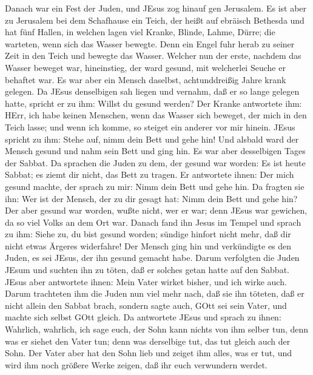  Danach war ein Fest der Juden, und JEsus zog hinauf gen
Jerusalem.  Es ist aber zu Jerusalem bei dem Schafhause ein
Teich, der heißt auf ebräisch Bethesda und hat fünf Hallen, 
in welchen lagen viel Kranke, Blinde, Lahme, Dürre; die warteten, wenn
sich das Wasser bewegte.  Denn ein Engel fuhr herab zu
seiner Zeit in den Teich und bewegte das Wasser. Welcher nun der erste,
nachdem das Wasser beweget war, hineinstieg, der ward gesund, mit
welcherlei Seuche er behaftet war.  Es war aber ein Mensch
daselbst, achtunddreißig Jahre krank gelegen.  Da JEsus
denselbigen sah liegen und vernahm, daß er so lange gelegen hatte,
spricht er zu ihm: Willst du gesund werden?  Der Kranke
antwortete ihm: HErr, ich habe keinen Menschen, wenn das Wasser sich
beweget, der mich in den Teich lasse; und wenn ich komme, so steiget ein
anderer vor mir hinein.  JEsus spricht zu ihm: Stehe auf,
nimm dein Bett und gehe hin!  Und alsbald ward der Mensch
gesund und nahm sein Bett und ging hin. Es war aber desselbigen Tages
der Sabbat.  Da sprachen die Juden zu dem, der gesund war
worden: Es ist heute Sabbat; es ziemt dir nicht, das Bett zu tragen.
 Er antwortete ihnen: Der mich gesund machte, der sprach zu
mir: Nimm dein Bett und gehe hin.  Da fragten sie ihn: Wer
ist der Mensch, der zu dir gesagt hat: Nimm dein Bett und gehe hin?
 Der aber gesund war worden, wußte nicht, wer er war; denn
JEsus war gewichen, da so viel Volks an dem Ort war. 
Danach fand ihn Jesus im Tempel und sprach zu ihm: Siehe zu, du bist
gesund worden; sündige hinfort nicht mehr, daß dir nicht etwas Ärgeres
widerfahre!  Der Mensch ging hin und verkündigte es den
Juden, es sei JEsus, der ihn gesund gemacht habe.  Darum
verfolgten die Juden JEsum und suchten ihn zu töten, daß er solches
getan hatte auf den Sabbat.  JEsus aber antwortete ihnen:
Mein Vater wirket bisher, und ich wirke auch.  Darum
trachteten ihm die Juden nun viel mehr nach, daß sie ihn töteten, daß er
nicht allein den Sabbat brach, sondern sagte auch, GOtt sei sein Vater,
und machte sich selbst GOtt gleich.  Da antwortete JEsus
und sprach zu ihnen: Wahrlich, wahrlich, ich sage euch, der Sohn kann
nichts von ihm selber tun, denn was er siehet den Vater tun; denn was
derselbige tut, das tut gleich auch der Sohn.  Der Vater
aber hat den Sohn lieb und zeiget ihm alles, was er tut, und wird ihm
noch größere Werke zeigen, daß ihr euch verwundern werdet. 
